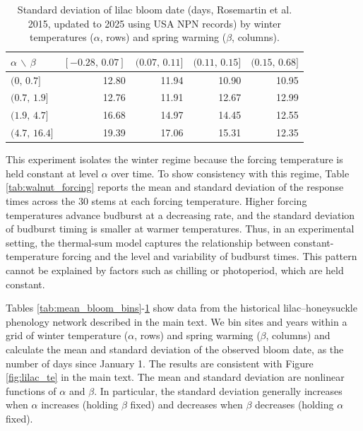 \documentclass[
]{article}
\begin{document}
{\begin{table}[t]
\vspace{2em}

\centering
\caption{Standard deviation of lilac bloom date (days, Rosemartin et al. 2015, updated to 2025 using USA NPN records) by winter temperatures ($\alpha$, rows) and spring warming ($\beta$, columns).}
\label{tab:sd_bloom_bins}
\begin{tabular}{lrrrr}
\toprule
$\alpha$ $\backslash$ $\beta$
& $[-0.28,\,0.07]$ & $(0.07,\,0.11]$ & $(0.11,\,0.15]$ & $(0.15,\,0.68]$ \\
\midrule
$(0,\,0.7]$     & 12.80 & 11.94 & 10.90 &  10.95 \\
$(0.7,\,1.9]$   & 12.76 & 11.91 & 12.67 & 12.99 \\
$(1.9,\,4.7]$     & 16.68 & 14.97 & 14.45 & 12.55 \\
$(4.7,\,16.4]$    & 19.39 & 17.06 & 15.31 & 12.35 \\
\bottomrule
\end{tabular}
\end{table}

This experiment isolates the winter regime because the forcing temperature is held
constant at level \(\alpha\) over time. To show consistency with this regime, Table 
\ref{tab:walnut_forcing} reports the mean and standard deviation
of the response times across the 30 stems at each forcing temperature.
Higher forcing temperatures advance budburst at a decreasing rate, 
and the standard deviation of budburst timing is 
smaller at warmer temperatures. Thus, in an experimental setting, the 
thermal-sum model captures the relationship between
constant-temperature forcing and the level and variability of
budburst times. This pattern cannot be explained by factors such as chilling or photoperiod, which are held constant.

Tables \ref{tab:mean_bloom_bins}-\ref{tab:sd_bloom_bins} show data from
the historical lilac--honeysuckle phenology network described in the main text. 
We bin sites and years within a grid of winter temperature (\(\alpha\), rows) and spring warming (\(\beta\), columns) 
and calculate the mean and standard deviation of the observed bloom date, as the number of days since January 1. 
The results are consistent with Figure \ref{fig:lilac_te} in the main text.
The mean and standard deviation are nonlinear functions of $\alpha$ and $\beta$. In particular, the standard deviation generally increases when
$\alpha$ increases (holding $\beta$ fixed) and decreases when $\beta$ decreases (holding $\alpha$ fixed). 

}
\end{document}

